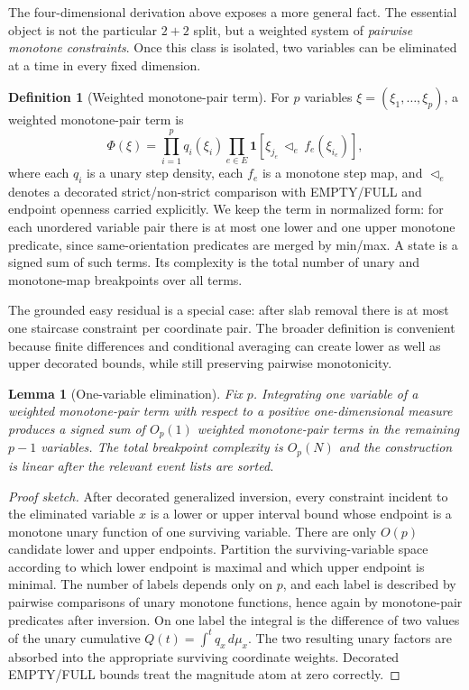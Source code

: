 \documentclass[12pt,a4paper]{article}
\newtheorem{lemma}[theorem]{Lemma}
\theoremstyle{definition}
\newtheorem{definition}[theorem]{Definition}
\newcommand{\1}{\mathbf 1}
\begin{document}
The four-dimensional derivation above exposes a more general fact.  The essential object is not the particular $2+2$ split, but a weighted system of \emph{pairwise monotone constraints}.  Once this class is isolated, two variables can be eliminated at a time in every fixed dimension.

\begin{definition}[Weighted monotone-pair term]                  \label{def:pairterm}
For $p$ variables $\xi=(\xi_1,\ldots,\xi_p)$, a weighted monotone-pair term is
\begin{equation}
\Phi(\xi)=\prod_{i=1}^p q_i(\xi_i)
          \prod_{e\in E}\mathbf 1[\xi_{j_e}\,\triangleleft_e\, f_e(\xi_{i_e})],       \label{eq:pairterm}
\end{equation}
where each $q_i$ is a unary step density, each $f_e$ is a monotone step map, and $\triangleleft_e$ denotes a decorated strict/non-strict comparison with EMPTY/FULL and endpoint openness carried explicitly.  We keep the term in normalized form: for each unordered variable pair there is at most one lower and one upper monotone predicate, since same-orientation predicates are merged by min/max.  A state is a signed sum of such terms.  Its complexity is the total number of unary and monotone-map breakpoints over all terms.
\end{definition}

The grounded easy residual is a special case: after slab removal there is at most one staircase constraint per coordinate pair.  The broader definition is convenient because finite differences and conditional averaging can create lower as well as upper decorated bounds, while still preserving pairwise monotonicity.

\begin{lemma}[One-variable elimination]                          \label{lem:oneelim}
Fix $p$.  Integrating one variable of a weighted monotone-pair term with respect to a positive one-dimensional measure produces a signed sum of $O_p(1)$ weighted monotone-pair terms in the remaining $p-1$ variables.  The total breakpoint complexity is $O_p(N)$ and the construction is linear after the relevant event lists are sorted.
\end{lemma}

\begin{proof}[Proof sketch]
After decorated generalized inversion, every constraint incident to the eliminated variable $x$ is a lower or upper interval bound whose endpoint is a monotone unary function of one surviving variable.  There are only $O(p)$ candidate lower and upper endpoints.  Partition the surviving-variable space according to which lower endpoint is maximal and which upper endpoint is minimal.  The number of labels depends only on $p$, and each label is described by pairwise comparisons of unary monotone functions, hence again by monotone-pair predicates after inversion.  On one label the integral is the difference of two values of the unary cumulative $Q(t)=\int^t q_x\,d\mu_x$.  The two resulting unary factors are absorbed into the appropriate surviving coordinate weights.  Decorated EMPTY/FULL bounds treat the magnitude atom at zero correctly.
\end{proof}
\end{document}
